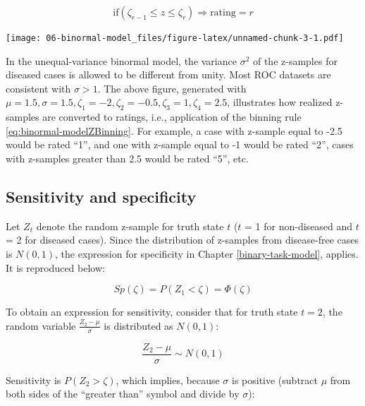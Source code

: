 \documentclass[
]{book}
\begin{document}
\begin{equation} 
\text{if} \left (\zeta_{r-1} \le z \le \zeta_r  \right )\Rightarrow \text {rating} = r
\label{eq:binormal-modelZBinning}
\end{equation}

\texttt{[image: 06-binormal-model\_files/figure-latex/unnamed-chunk-3-1.pdf]}

In the unequal-variance binormal model, the variance \(\sigma^2\) of the z-samples for diseased cases is allowed to be different from unity. Most ROC datasets are consistent with \(\sigma > 1\). The above figure, generated with \(\mu = 1.5, \sigma = 1.5, \zeta_1 = -2, \zeta_2 = -0.5, \zeta_3 = 1, \zeta_4 = 2.5\), illustrates how realized z-samples are converted to ratings, i.e., application of the binning rule \eqref{eq:binormal-modelZBinning}. For example, a case with z-sample equal to -2.5 would be rated ``1'', and one with z-sample equal to -1 would be rated ``2'', cases with z-samples greater than 2.5 would be rated ``5'', etc.

\hypertarget{sensitivity-and-specificity-1}{%
\subsection{Sensitivity and specificity}\label{sensitivity-and-specificity-1}}

Let \(Z_t\) denote the random z-sample for truth state \(t\) (\(t\) = 1 for non-diseased and \(t\) = 2 for diseased cases). Since the distribution of z-samples from disease-free cases is \(N(0,1)\), the expression for specificity in Chapter \ref{binary-task-model}, applies. It is reproduced below:

\begin{equation} 
Sp\left ( \zeta \right )=P\left ( Z_1 < \zeta \right )=\Phi\left ( \zeta \right )
\label{eq:binormal-model-specificity}
\end{equation}

To obtain an expression for sensitivity, consider that for truth state \(t = 2\), the random variable \(\frac{Z_2-\mu}{\sigma}\) is distributed as \(N(0,1)\):

\begin{equation*} 
\frac{Z_2-\mu}{\sigma}\sim N\left ( 0,1 \right )
\end{equation*}

Sensitivity is \(P\left ( Z_2 > \zeta \right )\), which implies, because \(\sigma\) is positive (subtract \(\mu\) from both sides of the ``greater than'' symbol and divide by \(\sigma\)):
\end{document}

